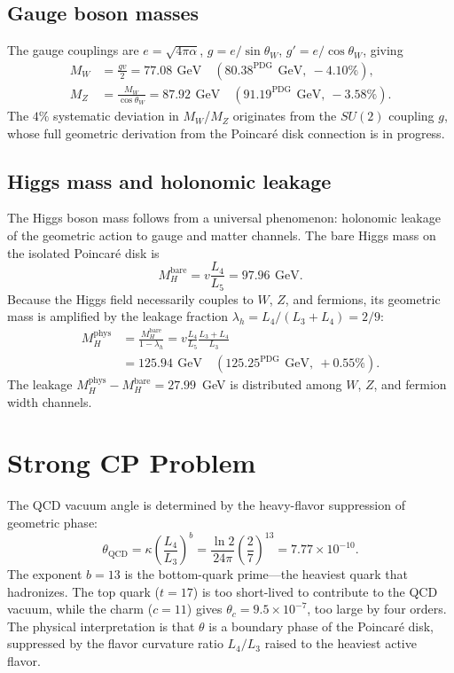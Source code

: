 \documentclass[aps,prd,reprint,twocolumn,showpacs,superscriptaddress]{revtex4-2}
\newcommand{\gev}{\,\text{GeV}}
\newcommand{\PDG}[1]{\ensuremath{#1^{\text{PDG}}}}
\begin{document}
\subsection{Gauge boson masses}

The gauge couplings are $e = \sqrt{4\pi\alpha}$,
$g = e/\sin\theta_W$, $g' = e/\cos\theta_W$, giving
\begin{align}
M_W &= \frac{gv}{2} = 77.08\ \gev
     \quad (\PDG{80.38}\ \gev,\ -4.10\%), \\
M_Z &= \frac{M_W}{\cos\theta_W} = 87.92\ \gev
     \quad (\PDG{91.19}\ \gev,\ -3.58\%).
\end{align}
The $4\%$ systematic deviation in $M_W$/$M_Z$ originates from the
$SU(2)$ coupling $g$, whose full geometric derivation from the
Poincar\'{e} disk connection is in progress.

\subsection{Higgs mass and holonomic leakage}

The Higgs boson mass follows from a universal phenomenon:
holonomic leakage of the geometric action to gauge and matter
channels.  The bare Higgs mass on the isolated Poincar\'{e} disk is
\begin{equation}
M_H^{\text{bare}} = v \frac{L_4}{L_5} = 97.96\ \gev.
\end{equation}
Because the Higgs field necessarily couples to $W$, $Z$, and fermions,
its geometric mass is amplified by the leakage fraction
$\lambda_h = L_4/(L_3+L_4) = 2/9$:
\begin{align}
M_H^{\text{phys}} &= \frac{M_H^{\text{bare}}}{1 - \lambda_h}
                  = v \frac{L_4}{L_5} \frac{L_3 + L_4}{L_3} \\
                &= 125.94\ \gev
                \quad (\PDG{125.25}\ \gev,\ +0.55\%).
\end{align}
The leakage $M_H^{\text{phys}} - M_H^{\text{bare}} = 27.99$~GeV is
distributed among $W$, $Z$, and fermion width channels.

\section{Strong CP Problem}
\label{sec:strongcp}

The QCD vacuum angle is determined by the
heavy-flavor suppression of geometric phase:
\begin{equation}
\theta_{\text{QCD}} = \kappa \left(\frac{L_4}{L_3}\right)^b
                    = \frac{\ln 2}{24\pi} \left(\frac{2}{7}\right)^{13}
                    = 7.77 \times 10^{-10}.
\end{equation}
The exponent $b = 13$ is the bottom-quark prime---the heaviest quark
that hadronizes.  The top quark ($t = 17$) is too short-lived to
contribute to the QCD vacuum, while the charm ($c = 11$) gives
$\theta_c = 9.5 \times 10^{-7}$, too large by four orders.
The physical interpretation is that $\theta$ is a boundary phase
of the Poincar\'{e} disk, suppressed by the flavor curvature ratio
$L_4/L_3$ raised to the heaviest active flavor.
\end{document}
